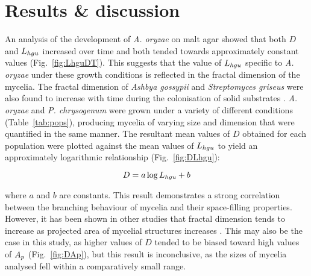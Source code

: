 \section{Results \& discussion}

An analysis of the development of \emph{A. oryzae} on malt agar showed that both $D$ and $L_{hgu}$ increased over time and both tended towards approximately constant values (Fig.~\ref{fig:LhguDT}). This suggests that the value of $L_{hgu}$ specific to \emph{A. oryzae} under these growth conditions is reflected in the fractal dimension of the mycelia. The fractal dimension of \emph{Ashbya gossypii} and \emph{Streptomyces griseus} were also found to increase with time during the colonisation of solid substrates \cite{obert1990}. \emph{A. oryzae} and \emph{P. chrysogenum} were grown under a variety of different conditions (Table~\ref{tab:pops}), producing mycelia of varying size and dimension that were quantified in the same manner. The resultant mean values of $D$ obtained for each population were plotted against the mean values of $L_{hgu}$ to yield an approximately logarithmic relationship (Fig.~\ref{fig:DLhgu}):

\begin{equation} \label{eq:DaLhguB}
	D = a \log L_{hgu} +b
\end{equation}

\noindent where $a$ and $b$ are constants. This result demonstrates a strong correlation between the branching behaviour of mycelia and their space-filling properties. However, it has been shown in other studies that fractal dimension tends to increase as projected area of mycelial structures increases \cite{papagianni2006b}. This may also be the case in this study, as higher values of $D$ tended to be biased toward high values of $A_p$ (Fig.~\ref{fig:DAp}), but this result is inconclusive, as the sizes of mycelia analysed fell within a comparatively small range.


